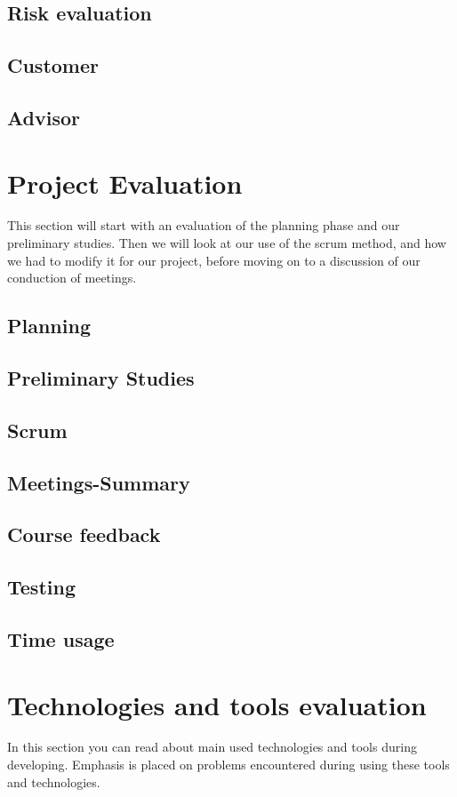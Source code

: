 \subsection{Risk evaluation}
\subsection{Customer} 
\subsection{Advisor}
\section{Project Evaluation}
This section will start with an evaluation of the planning phase and our preliminary studies.  
Then we will look at our use of the scrum method, and how we had to modify it for our project, before moving on to a discussion of our conduction of meetings. 
\subsection{Planning}
\subsection{Preliminary Studies}
\subsection{Scrum}
\subsection{Meetings-Summary}
\subsection{Course feedback}
\subsection{Testing}
\subsection{Time usage}
\section{Technologies and tools evaluation}
In this section you can read about main used technologies and tools during developing.
Emphasis is placed on problems encountered during using these tools and technologies.

